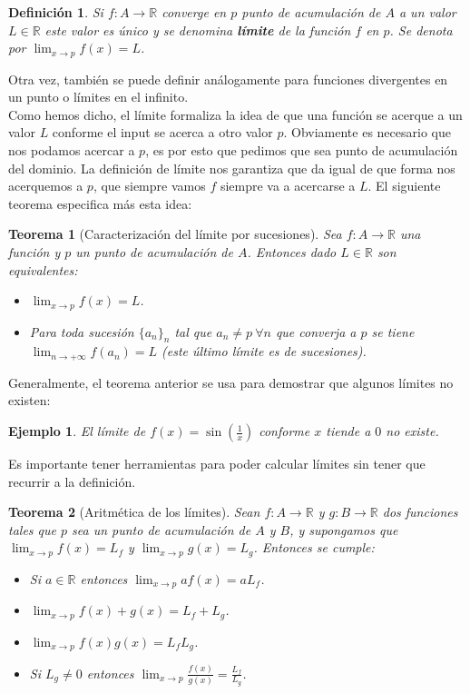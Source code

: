 \documentclass{article}
\newtheorem{theorem}{Teorema}
\newtheorem{define}{Definición}
\newtheorem{ejem}{Ejemplo}
\newcommand{\reales}{\mathbb{R}}
\begin{document}
\begin{define}
	Si $f: A \rightarrow \reales$ converge en $p$ punto de acumulación de $A$ a un valor $L \in \reales$ este valor es único y se denomina \textbf{límite} de la función $f$ en $p$. Se denota por $\lim_{x \rightarrow p} f(x) = L$.
\end{define}

Otra vez, también se puede definir análogamente para funciones divergentes en un punto o límites en el infinito.\\ 

Como hemos dicho, el límite formaliza la idea de que una función se acerque a un valor $L$ conforme el input se acerca a otro valor $p$. Obviamente es necesario que nos podamos acercar a $p$, es por esto que pedimos que sea punto de acumulación del dominio. La definición de límite nos garantiza que da igual de que forma nos acerquemos a $p$, que siempre vamos $f$ siempre va a acercarse a $L$. El siguiente teorema especifica más esta idea:
\begin{theorem}[Caracterización del límite por sucesiones]
	Sea $f: A \rightarrow \reales$ una función y $p$ un punto de acumulación de $A$. Entonces dado $L \in \reales$ son equivalentes:
	\begin{itemize}
		\item
		$\lim_{x \rightarrow p} f(x) = L$.
		\item
		Para toda sucesión $\{a_n \}_n$ tal que $a_n \neq p\ \forall n$ que converja a $p$ se tiene $\lim_{n \rightarrow +\infty} f(a_n) = L$ (este último límite es de sucesiones).
	\end{itemize}
\end{theorem}

Generalmente, el teorema anterior se usa para demostrar que algunos límites no existen:
\begin{ejem}
	El límite de $f(x) = \sin (\frac{1}{x})$ conforme $x$ tiende a $0$ no existe.
\end{ejem}

Es importante tener herramientas para poder calcular límites sin tener que recurrir a la definición.

\begin{theorem}[Aritmética de los límites]
	Sean $f: A \rightarrow \reales$ y $g: B \rightarrow \reales$ dos funciones tales que $p$ sea un punto de acumulación de $A$ y $B$, y supongamos que $\lim_{x \rightarrow p} f(x) = L_f$ y $\lim_{x \rightarrow p} g(x) = L_g$. Entonces se cumple:
	\begin{itemize}
		\item
		Si $a \in \reales$ entonces $\lim_{x \rightarrow p} af(x) = aL_f$.
		\item
		$\lim_{x \rightarrow p} f(x) + g(x) = L_f + L_g$.
		\item
		$\lim_{x \rightarrow p} f(x)g(x) = L_f L_g$.
		\item
		Si $L_g \neq 0$ entonces $\lim_{x \rightarrow p} \frac{f(x)}{g(x)} = \frac{L_f}{L_g}$.
	\end{itemize}
\end{theorem}
\end{document}
